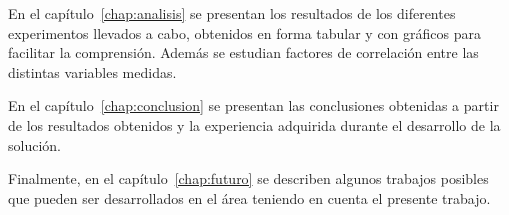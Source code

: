 
En el capítulo~\ref{chap:analisis} se presentan los resultados de los diferentes
experimentos llevados a cabo, obtenidos en forma tabular y con gráficos para
facilitar la comprensión. Además se estudian factores de correlación entre las
distintas variables medidas.


En el capítulo~\ref{chap:conclusion} se presentan las
conclusiones obtenidas a partir de los resultados obtenidos y la experiencia
adquirida durante el desarrollo de la solución.


Finalmente, en el capítulo~\ref{chap:futuro} se describen algunos trabajos posibles que pueden
ser desarrollados en el área teniendo en cuenta el presente trabajo. 

